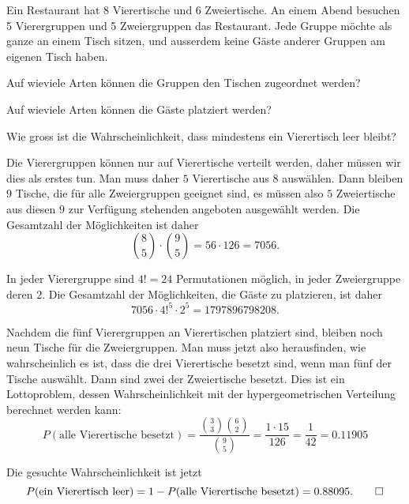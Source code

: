 Ein Restaurant hat 8 Vierertische und 6 Zweiertische.
An einem Abend besuchen 5 Vierergruppen und 5 Zweiergruppen das Restaurant.
Jede Gruppe möchte als ganze an einem Tisch sitzen, und ausserdem
keine Gäste anderer Gruppen am eigenen Tisch haben.
\begin{teilaufgaben}
\item Auf wieviele Arten können die Gruppen den Tischen zugeordnet
werden?
\item Auf wieviele Arten können die Gäste platziert werden?
\item Wie gross ist die Wahrscheinlichkeit, dass mindestens ein Vierertisch
leer bleibt?
\end{teilaufgaben}

\begin{loesung}
\begin{teilaufgaben}
\item
Die Vierergruppen können nur auf Vierertische verteilt werden,
daher müssen wir dies als erstes tun.
Man muss daher $5$ Vierertische aus $8$ auswählen.
Dann bleiben $9$ Tische, die für alle Zweiergruppen geeignet sind,
es müssen also $5$ Zweiertische aus diesen $9$ zur Verfügung stehenden
angeboten ausgewählt werden. 
Die Gesamtzahl der Möglichkeiten ist daher
\[
\binom{8}{5}\cdot\binom{9}{5}=
56\cdot 126=7056.
\]
\item
In jeder Vierergruppe sind $4!=24$ Permutationen möglich, in jeder
Zweiergruppe deren $2$.
Die Gesamtzahl der Möglichkeiten, die Gäste zu platzieren, ist daher
\[
7056\cdot 4!^5 \cdot 2^5=1797896798208.
\]
\item
Nachdem die fünf Vierergruppen an Vierertischen platziert sind, bleiben
noch neun Tische für die Zweiergruppen.
Man muss jetzt also herausfinden, wie wahrscheinlich es ist, dass die
drei Vierertische besetzt sind, wenn man fünf der Tische auswählt.
Dann sind zwei der Zweiertische besetzt.
Dies ist ein Lottoproblem, dessen Wahrscheinlichkeit mit der
hypergeometrischen Verteilung berechnet werden kann:
\[
P(\text{alle Vierertische besetzt})
=
\frac{\binom{3}{3}\binom{6}{2}}{\binom{9}{5}}
=
\frac{1\cdot 15}{126}
=
\frac1{42}=0.11905
\]
\end{teilaufgaben}
Die gesuchte Wahrscheinlichkeit ist jetzt
\[
P(\text{ein Vierertisch leer})
=
1-P(\text{alle Vierertische besetzt})
=
0.88095.
\qedhere
\]
\end{loesung}

